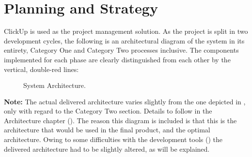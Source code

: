 \section{Planning and Strategy}
ClickUp \autocite{ClickUpOneApp} is used as the project management solution. 
As the project is split in two development cycles, the following is an architectural diagram
of the system in its entirety, Category One and Category Two processes inclusive.
The components implemented for each phase are clearly distinguished from each other by the vertical, double-red lines:
\begin{figure}[H]
	\centering
	\caption[System Architecture]{System Architecture.}
	\label{fig:sys_archi}
\end{figure}
\textbf{Note:} The actual delivered architecture varies slightly from the one depicted in , only with regard to the Category Two section.
Details to follow in the Architecture chapter ().
The reason this diagram is included is that this is the architecture that would be used in the final product, and the optimal architecture. Owing to some
difficulties with the development tools () the delivered architecture had to be slightly altered, as will be explained.








